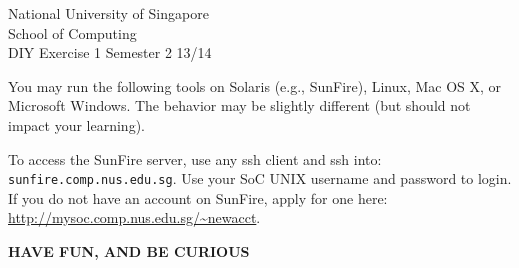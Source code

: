 \documentclass[a4paper,11pt]{exam}
\begin{document}
\extraheadheight{.5in}
%
{\large\sf National University of Singapore\\ School of Computing \\
\LARGE\sf DIY Exercise 1}%
{\large\sf Semester 2 13/14}
\firstpageheadrule
\pagestyle{headandfoot}

You may run the following tools on Solaris (e.g., SunFire), Linux, Mac OS X, or Microsoft Windows.  The behavior may be slightly different (but should not impact your learning).

To access the SunFire server, use any ssh client and ssh into:
\texttt{sunfire.comp.nus.edu.sg}.   Use your SoC UNIX username and password to login.  If you do not have an account on SunFire, apply for one here: \url{http://mysoc.comp.nus.edu.sg/~newacct}.

\begin{center}
	\textbf\textsf{HAVE FUN, AND BE CURIOUS}
\end{center}
\end{document}
